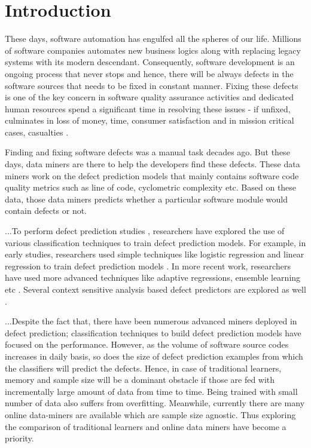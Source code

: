 \documentclass[sigplan]{acmart}\settopmatter{printfolios=true,printccs=false,printacmref=false}
\begin{document}
\section{Introduction}
These days, software automation has engulfed all the spheres of our life. Millions of software companies automates new business logics along with replacing legacy systems with its modern descendant. Consequently, software development is an ongoing process that never stops and hence, there will be always defects in the software sources that needs to be fixed in constant manner. Fixing these defects is one of the key concern in software quality assurance activities and dedicated human resources spend a significant time in resolving these issues - if unfixed, culminates in loss of money, time, consumer satisfaction and in mission critical cases, casualties \cite{erlikh2000leveraging}.  

Finding and fixing software defects was a manual task decades ago. But these days, data miners are there to help the developers find these defects. These data miners work on the defect prediction models that mainly contains software code quality metrics such as line of code, cyclometric complexity etc. Based on these data, those data miners predicts whether a particular software module would contain defects or not.  

...To perform defect prediction studies \cite{hall2012systematic, shihab2012exploration}, researchers have explored the use of various classification techniques to train defect prediction models. For example, in early studies, researchers used simple techniques like logistic regression and linear regression to train defect prediction models \cite{basili1996validation, hassan2009predicting}. In more recent work, researchers have used more advanced techniques like adaptive regressions, ensemble learning etc \cite{bettenburg2012think, dietterich2000experimental}. Several context sensitive analysis based defect predictors are explored as well \cite{menzies2011local}.  

...Despite the fact that, there have been numerous advanced miners deployed in defect prediction; classification techniques to build defect prediction models have focused on the performance. However, as the volume of software source codes increases in daily basis, so does the size of defect prediction examples from which the classifiers will predict the defects. Hence, in case of traditional learners, memory and sample size will be a dominant obstacle if those are fed with incrementally large amount of data from time to time. Being trained with small number of data also suffers from overfitting. Meanwhile, currently there are many online data-miners are available which are sample size agnostic. Thus exploring the comparison of traditional learners and online data miners have become a priority.  
\end{document}
